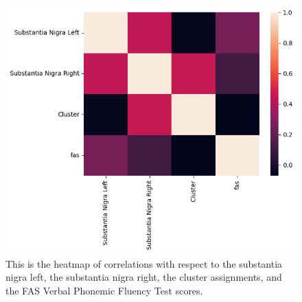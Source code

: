 \documentclass[12pt]{article}
\begin{document}
\FloatBarrier

\begin{figure}[h]  %
    \centering
    \includegraphics[width=\textwidth]{"../img/fALFF_SN_fas_test_correlation_heatmap.png"}  %
    \caption{This is the heatmap of correlations with respect to the substantia nigra left, the substantia nigra right, the cluster assignments, and the FAS Verbal Phonemic Fluency Test scores.}
    \label{fig:heatmap}  %
\end{figure}

\FloatBarrier
\end{document}

